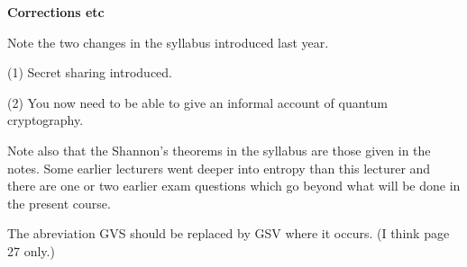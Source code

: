 \documentclass[12pt,a4paper]{article}
\theoremstyle{plain}
\theoremstyle{definition}
\begin{document}
\begin{center} {\bf Corrections etc}\end{center}
\vspace{2\baselineskip}
Note the two changes in the syllabus introduced last year.

(1) Secret sharing introduced. 

(2) You now need to be able to give an informal
account of quantum cryptography.

Note also that the Shannon's theorems in the syllabus
are those given in the notes. Some earlier lecturers
went deeper into entropy than this lecturer and there
are one or two earlier exam questions which go beyond
what will be done in the present course.

The abreviation GVS should be replaced by GSV where
it occurs. (I think page 27 only.) 

\vspace{2\baselineskip}
\end{document}
